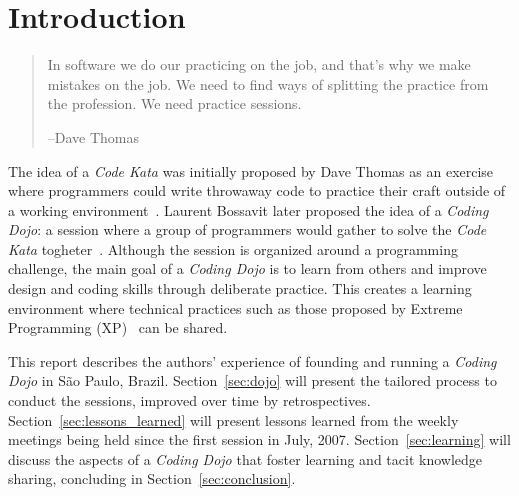 \section{Introduction}\label{sec:introduction}

\begin{quote}
In software we do our practicing on the job, and that’s why we make mistakes on the job.
We need to find ways of splitting the practice from the profession. We need practice sessions.

--Dave Thomas
\end{quote}

The idea of a \emph{Code Kata} was initially proposed by Dave Thomas as an exercise where programmers
could write throwaway code to practice their craft outside of a working environment~\cite{DaveThomas}.
Laurent Bossavit later proposed the idea of a \emph{Coding Dojo}: a session where a group of programmers
would gather to solve the \emph{Code Kata} togheter~\cite{Bossavit}. Although the session is organized
around a programming challenge, the main goal of a \emph{Coding Dojo} is to learn from others and
improve design and coding skills through deliberate practice. This creates a learning environment where
technical practices such as those proposed by Extreme Programming (XP)~\cite{XP2E} can be shared.

This report describes the authors' experience of founding and running a \emph{Coding Dojo} in
São Paulo, Brazil. Section~\ref{sec:dojo} will present the tailored process to conduct the sessions,
improved over time by retrospectives. Section~\ref{sec:lessons_learned} will present lessons
learned from the weekly meetings being held since the first session in July, 2007.
Section~\ref{sec:learning} will discuss the aspects of a \emph{Coding Dojo} that foster learning and
tacit knowledge sharing, concluding in Section~\ref{sec:conclusion}.